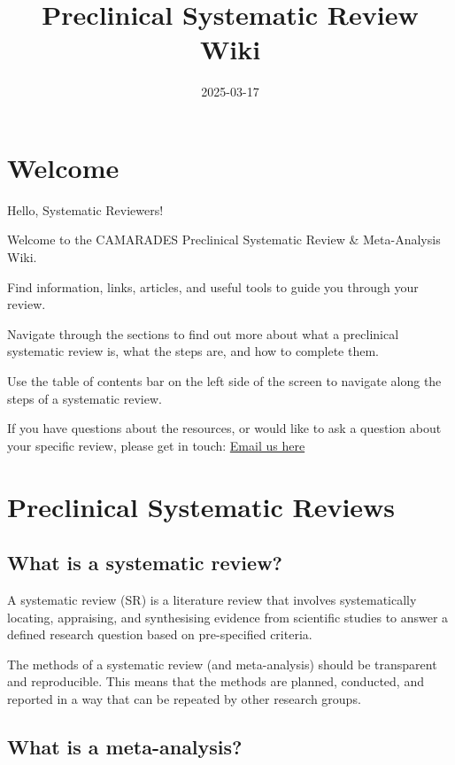 \documentclass[
]{book}
\title{Preclinical Systematic Review Wiki}
\author{}
\date{\vspace{-2.5em}2025-03-17}
\begin{document}
\maketitle

{
\setcounter{tocdepth}{1}
\tableofcontents
}
\chapter{Welcome}\label{welcome}

Hello, Systematic Reviewers!

Welcome to the CAMARADES Preclinical Systematic Review \& Meta-Analysis Wiki.

Find information, links, articles, and useful tools to guide you through your review.

Navigate through the sections to find out more about what a preclinical systematic review is, what the steps are, and how to complete them.

Use the table of contents bar on the left side of the screen to navigate along the steps of a systematic review.

If you have questions about the resources, or would like to ask a question about your specific review, please get in touch:
\href{mailto:CAMARADES.berlin@charite.de}{Email us here}

\chapter{Preclinical Systematic Reviews}\label{intro}

\section{What is a systematic review?}\label{what-is-a-systematic-review}

A systematic review (SR) is a literature review that involves systematically locating, appraising, and synthesising evidence from scientific studies to answer a defined research question based on pre-specified criteria.

The methods of a systematic review (and meta-analysis) should be transparent and reproducible. This means that the methods are planned, conducted, and reported in a way that can be repeated by other research groups.

\section{What is a meta-analysis?}\label{what-is-a-meta-analysis}
\end{document}
